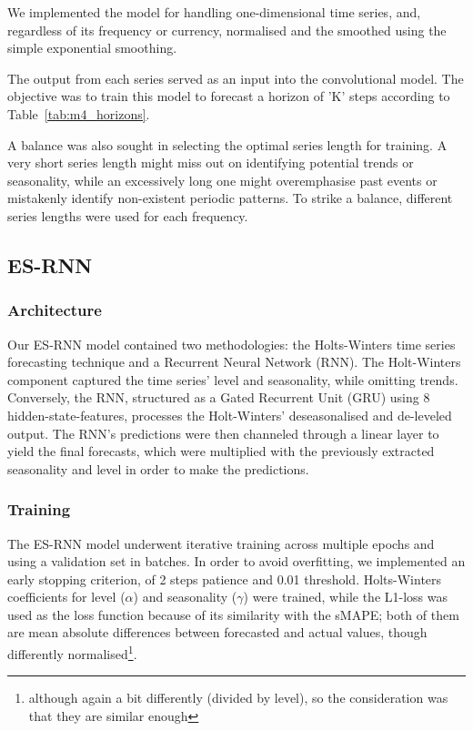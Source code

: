 \documentclass[conference]{IEEEtran}
\begin{document}
We implemented the model for handling one-dimensional time series, and, regardless of its frequency or currency, normalised and the smoothed using the simple exponential smoothing.

The output from each series served as an input into the convolutional model. The objective was to train this model to forecast a horizon of 'K' steps according to Table~\ref{tab:m4_horizons}.

A balance was also sought in selecting the optimal series length for training. A very short series length might miss out on identifying potential trends or seasonality, while an excessively long one might overemphasise past events or mistakenly identify non-existent periodic patterns. To strike a balance, different series lengths were used for each frequency.

\subsection{ES-RNN}

\subsubsection{Architecture}

Our ES-RNN model contained two methodologies: the Holts-Winters time series forecasting technique and a Recurrent Neural Network (RNN). The Holt-Winters component captured the time series' level and seasonality, while omitting trends. Conversely, the RNN, structured as a Gated Recurrent Unit (GRU) using 8 hidden-state-features, processes the Holt-Winters' deseasonalised and de-leveled output. The RNN's predictions were then channeled through a linear layer to yield the final forecasts, which were multiplied with the previously extracted seasonality and level in order to make the predictions.

\subsubsection{Training}

The ES-RNN model underwent iterative training across multiple epochs and using a validation set in batches. In order to avoid overfitting, we implemented an early stopping criterion, of 2 steps patience and 0.01 threshold. Holts-Winters coefficients for level ($\alpha$) and seasonality ($\gamma$) were trained, while the L1-loss was used as the loss function because of its similarity with the sMAPE; both of them are mean absolute differences between forecasted and actual values, though differently normalised\footnote{although again a bit differently (divided by level), so the consideration was that they are similar enough}.
\end{document}
